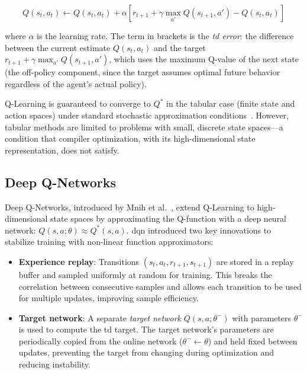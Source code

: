 \begin{equation}
    Q(s_t, a_t) \leftarrow Q(s_t, a_t) + \alpha \left[ r_{t+1} + \gamma \max_{a'} Q(s_{t+1}, a') - Q(s_t, a_t) \right]
\end{equation}

where $\alpha$ is the learning rate. The term in brackets is the \textit{\gls{td} error}: the difference between the current estimate $Q(s_t, a_t)$ and the target $r_{t+1} + \gamma \max_{a'} Q(s_{t+1}, a')$, which uses the maximum Q-value of the next state (the off-policy component, since the target assumes optimal future behavior regardless of the agent's actual policy).

Q-Learning is guaranteed to converge to $Q^*$ in the tabular case (finite state and action spaces) under standard stochastic approximation conditions~\cite{watkins1992qlearning}. However, tabular methods are limited to problems with small, discrete state spaces—a condition that compiler optimization, with its high-dimensional state representation, does not satisfy.

\subsection{Deep Q-Networks}

Deep Q-Networks, introduced by Mnih et al.~\cite{mnih2015human}, extend Q-Learning to high-dimensional state spaces by approximating the Q-function with a deep neural network: $Q(s, a; \theta) \approx Q^*(s, a)$. \gls{dqn} introduced two key innovations to stabilize training with non-linear function approximators:

\begin{itemize}
    \item \textbf{Experience replay}: Transitions $(s_t, a_t, r_{t+1}, s_{t+1})$ are stored in a replay buffer and sampled uniformly at random for training. This breaks the correlation between consecutive samples and allows each transition to be used for multiple updates, improving sample efficiency.

    \item \textbf{Target network}: A separate \textit{target network} $Q(s, a; \theta^-)$ with parameters $\theta^-$ is used to compute the \gls{td} target. The target network's parameters are periodically copied from the online network ($\theta^- \leftarrow \theta$) and held fixed between updates, preventing the target from changing during optimization and reducing instability.
\end{itemize}


